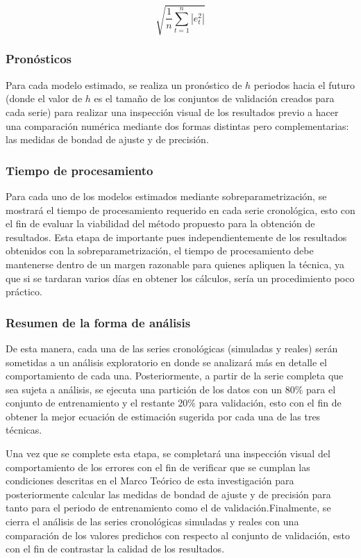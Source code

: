 \documentclass[
]{article}
\begin{document}
\begin{equation}
\label{eqn:RMSE}
\sqrt{\frac{1}{n}\sum_{t=1}^n |e_t^2|}
\end{equation}

\subsubsection{Pronósticos}

Para cada modelo estimado, se realiza un pronóstico de \(h\) periodos
hacia el futuro (donde el valor de \(h\) es el tamaño de los conjuntos
de validación creados para cada serie) para realizar una inspección
visual de los resultados previo a hacer una comparación numérica
mediante dos formas distintas pero complementarias: las medidas de
bondad de ajuste y de precisión.

\subsubsection{Tiempo de procesamiento}

Para cada uno de los modelos estimados mediante sobreparametrización, se
mostrará el tiempo de procesamiento requerido en cada serie cronológica,
esto con el fin de evaluar la viabilidad del método propuesto para la
obtención de resultados. Esta etapa de importante pues
independientemente de los resultados obtenidos con la
sobreparametrización, el tiempo de procesamiento debe mantenerse dentro
de un margen razonable para quienes apliquen la técnica, ya que si se
tardaran varios días en obtener los cálculos, sería un procedimiento
poco práctico.

\subsubsection{Resumen de la forma de análisis}

De esta manera, cada una de las series cronológicas (simuladas y reales)
serán sometidas a un análisis exploratorio en donde se analizará más en
detalle el comportamiento de cada una. Posteriormente, a partir de la
serie completa que sea sujeta a análisis, se ejecuta una partición de
los datos con un 80\% para el conjunto de entrenamiento y el restante
20\% para validación, esto con el fin de obtener la mejor ecuación de
estimación sugerida por cada una de las tres técnicas.

Una vez que se complete esta etapa, se completará una inspección visual
del comportamiento de los errores con el fin de verificar que se cumplan
las condiciones descritas en el Marco Teórico de esta investigación para
posteriormente calcular las medidas de bondad de ajuste y de precisión
para tanto para el periodo de entrenamiento como el de
validación.Finalmente, se cierra el análisis de las series cronológicas
simuladas y reales con una comparación de los valores predichos con
respecto al conjunto de validación, esto con el fin de contrastar la
calidad de los resultados.
\end{document}
